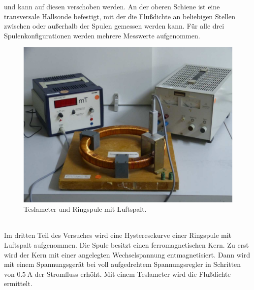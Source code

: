 und kann auf diesen verschoben werden. An der oberen Schiene ist eine transversale Hallsonde befestigt, mit der die Flußdichte an beliebigen 
Stellen zwischen oder außerhalb der Spulen gemessen werden kann. Für alle drei Spulenkonfigurationen werden mehrere Messwerte aufgenommen.
\\
\begin{figure}[h!]
    \centering
    \includegraphics[width=0.6\linewidth]{fotos/hysterese.png}
    \caption{Teslameter und Ringspule mit Luftspalt.\cite{V308}}
    \label{fig:ringspule}
\end{figure}
\\
Im dritten Teil des Versuches wird eine Hysteresekurve einer Ringspule mit Luftspalt aufgenommen. Die Spule besitzt einen ferromagnetischen Kern.
Zu erst wird der Kern mit einer angelegten Wechselspannung entmagnetisiert. Dann wird mit einem Spannungsgerät bei voll aufgedrehtem Spannungsregler in Schritten von 
$\SI{0.5}{\ampere}$ der Stromfluss erhöht. Mit einem Teslameter wird die Flußdichte ermittelt.
\newpage
